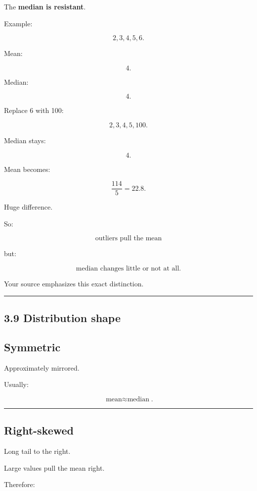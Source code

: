 \documentclass[
]{article}
\begin{document}
The \textbf{median is resistant}.

Example:

\[
2,3,4,5,6.
\]

Mean:

\[
4.
\]

Median:

\[
4.
\]

Replace 6 with 100:

\[
2,3,4,5,100.
\]

Median stays:

\[
4.
\]

Mean becomes:

\[
\frac{114}{5}=22.8.
\]

Huge difference.

So:

\[
\boxed{\text{outliers pull the mean}}
\]

but:

\[
\boxed{\text{median changes little or not at all}}.
\]

Your source emphasizes this exact distinction.

\begin{center}\rule{0.5\linewidth}{0.5pt}\end{center}

\subsection{3.9 Distribution shape}\label{distribution-shape}

\subsection{Symmetric}\label{symmetric}

Approximately mirrored.

Usually:

\[
\boxed{\text{mean}\approx\text{median}}.
\]

\begin{center}\rule{0.5\linewidth}{0.5pt}\end{center}

\subsection{Right-skewed}\label{right-skewed}

Long tail to the right.

Large values pull the mean right.

Therefore:
\end{document}
